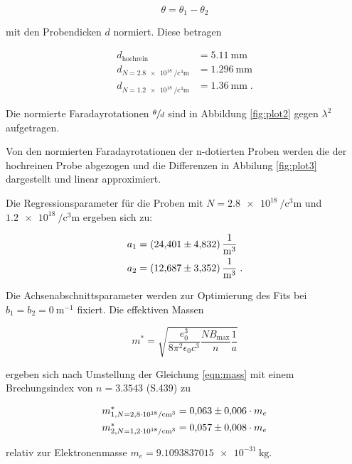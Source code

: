 \begin{equation}
    \theta = \theta_1 - \theta_2
\end{equation}

mit den Probendicken $d$ normiert.
Diese betragen

\begin{align*}
    d_\text{hochrein} &= \SI{5.11}{\milli\meter} \\
    d_{N = \SI{2.8e18}{\per\cubic\centi\meter}} &= \SI{1.296}{\milli\meter} \\
    d_{N = \SI{1.2e18}{\per\cubic\centi\meter}} &= \SI{1.36}{\milli\meter} \; .
\end{align*}

Die normierte Faradayrotationen $\sfrac{\theta}{d}$ sind in Abbildung \ref{fig:plot2} gegen $\lambda^2$ aufgetragen.

Von den normierten Faradayrotationen der n-dotierten Proben werden die der hochreinen Probe abgezogen und die Differenzen
in Abbilung \ref{fig:plot3} dargestellt und linear approximiert.

Die Regressionsparameter für die Proben mit $N = \SI{2.8e18}{\per\cubic\centi\meter}$ und 
$\SI{1.2e18}{\per\cubic\centi\meter}$ ergeben sich zu:

\begin{align*}
    a_1 &= \SI{24.401 +- 4.832}{\meter\tothe{-3}}\\
    a_2 &= \SI{12.687 +- 3.352}{\meter\tothe{-3}}\; .
\end{align*}

Die Achsenabschnittsparameter werden zur Optimierung des Fits bei $b_1 = b_2 = \SI{0}{\meter\tothe{-1}}$ fixiert.
Die effektiven Massen 

\begin{equation}
    m^* = \sqrt{\frac{e_0^3}{8\pi^2\epsilon_0 c^3} \frac{NB_\text{max}}{n} \frac{1}{a}}
\end{equation}

ergeben sich nach Umstellung der Gleichung \eqref{eqn:mass} mit einem Brechungsindex von $n = \num{3.3543}$ \cite{Brech} (S.439) zu 
 
\begin{align*}
    m^*_{1,N = \SI{2.8e18}{\per\cubic\centi\meter}} &= \num{0.063 +- 0.006} \cdot m_e \\
    m^*_{2,N = \SI{1.2e18}{\per\cubic\centi\meter}} &= \num{0.057 +- 0.008} \cdot m_e 
\end{align*}

relativ zur Elektronenmasse $m_e = \SI{9.1093837015e-31}{\kilo\gram}$.


